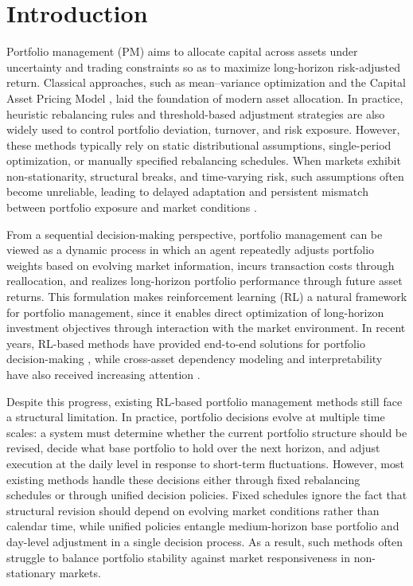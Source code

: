 \documentclass[letterpaper]{article} %
\begin{document}
\section{Introduction}

Portfolio management (PM) aims to allocate capital across assets under uncertainty and trading constraints so as to maximize long-horizon risk-adjusted return. Classical approaches, such as mean--variance optimization \citep{MVO} and the Capital Asset Pricing Model \citep{CAMP}, laid the foundation of modern asset allocation. In practice, heuristic rebalancing rules and threshold-based adjustment strategies are also widely used to control portfolio deviation, turnover, and risk exposure. However, these methods typically rely on static distributional assumptions, single-period optimization, or manually specified rebalancing schedules. When markets exhibit non-stationarity, structural breaks, and time-varying risk, such assumptions often become unreliable, leading to delayed adaptation and persistent mismatch between portfolio exposure and market conditions \citep{Perold1988DynamicSF}.

From a sequential decision-making perspective, portfolio management can be viewed as a dynamic process in which an agent repeatedly adjusts portfolio weights based on evolving market information, incurs transaction costs through reallocation, and realizes long-horizon portfolio performance through future asset returns. This formulation makes reinforcement learning (RL) a natural framework for portfolio management, since it enables direct optimization of long-horizon investment objectives through interaction with the market environment. In recent years, RL-based methods have provided end-to-end solutions for portfolio decision-making \citep{4,5,6}, while cross-asset dependency modeling and interpretability have also received increasing attention \citep{alphastock,8}.

Despite this progress, existing RL-based portfolio management methods still face a structural limitation. In practice, portfolio decisions evolve at multiple time scales: a system must determine whether the current portfolio structure should be revised, decide what base portfolio to hold over the next horizon, and adjust execution at the daily level in response to short-term fluctuations. However, most existing methods handle these decisions either through fixed rebalancing schedules or through unified decision policies. Fixed schedules ignore the fact that structural revision should depend on evolving market conditions rather than calendar time, while unified policies entangle medium-horizon base portfolio and day-level adjustment in a single decision process. As a result, such methods often struggle to balance portfolio stability against market responsiveness in non-stationary markets.
\end{document}
